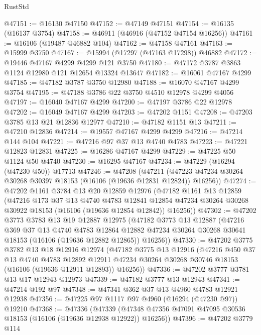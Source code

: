 \begin{lexlean}{RustStd}
\begin{coremodule}
@47151 := @16130 @47150
@47152 := @47149 @47151
@47154 := @16135 (@16137 @3754)
@47158 := @46911 (@46916 (@47152 @47154 @16256))
@47161 := @16106 (@19487 @46882 @104)
@47162 := @47158 @47161
@47163 := @15999 @3750
@47167 := @15994 (@17297 (@47163 @17298)) @46882
@47172 := @19446 @47167 @4299 @4299 @121 @3750
@47180 := @47172 @3787 @3863 @1124 @12980 @121 @12654 @13324 @13647
@47182 := @16061 @47167 @4299
@47185 := @47182 @3787 @3750 @12980
@47188 := @16070 @47167 @4299 @3754
@47195 := @47188 @3786 @22 @3750 @4510 @12978 @4299 @4056
@47197 := @16040 @47167 @4299
@47200 := @47197 @3786 @22 @12978
@47202 := @16049 @47167 @4299
@47203 := @47202 @1151
@47208 := @47203 @3785 @13 @21 @12836 @12977
@47210 := @47182 @1151 @13
@47211 := @47210 @12836
@47214 := @19557 @47167 @4299 @4299
@47216 := @47214 @144 @104
@47221 := @47216 @97 @37 @13 @4740 @4783
@47223 := @47221 @12823 @12831
@47225 := @16286 @47167 @4299
@47229 := @47225 @50 @1124 @50 @4740
@47230 := @16295 @47167
@47234 := @47229 (@16294 (@47230 @50)) @17713
@47246 := @47208
    (@47211 (@47223 @47234 @30264 @30268 @30397 @18153 (@16106 (@19636 @12831 @12824)) @16256))
@47274 := @47202
    @1161
    @3784
    @13
    @20
    @12859
    @12976
    (@47182
      @1161
      @13
      @12859
      (@47216
        @173
        @37
        @13
        @4740
        @4783
        @12841
        @12854
        @47234
        @30264
        @30268
        @30922
        @18153
        (@16106 (@19636 @12854 @12842))
        @16256))
@47302 := @47202
    @3773
    @3783
    @13
    @19
    @12887
    @12975
    (@47182
      @3773
      @13
      @12887
      (@47216
        @369
        @37
        @13
        @4740
        @4783
        @12864
        @12882
        @47234
        @30264
        @30268
        @30641
        @18153
        (@16106 (@19636 @12882 @12865))
        @16256))
@47330 := @47202
    @3775
    @3782
    @13
    @18
    @12916
    @12974
    (@47182
      @3775
      @13
      @12916
      (@47216
        @450
        @37
        @13
        @4740
        @4783
        @12892
        @12911
        @47234
        @30264
        @30268
        @30746
        @18153
        (@16106 (@19636 @12911 @12893))
        @16256))
@47336 := @47202 @3777 @3781 @13 @17 @12943 @12973
@47339 := @47182 @3777 @13 @12943
@47341 := @47214 @192 @97
@47348 := @47341 @362 @37 @13 @4960 @4783 @12921 @12938
@47356 := @47225 @97 @1117 @97 @4960 (@16294 (@47230 @97)) @19210
@47368 := @47336
    (@47339 (@47348 @47356 @47091 @47095 @30536 @18153 (@16106 (@19636 @12938 @12922)) @16256))
@47396 := @47202
    @3779
    @114

\end{coremodule}
\end{lexlean}
